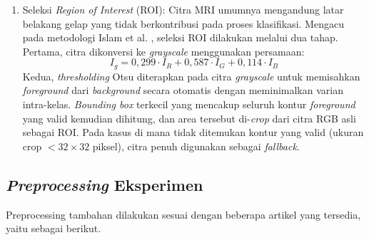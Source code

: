 \begin{enumerate}
	\item Seleksi \textit{Region of Interest} (ROI):
	Citra MRI umumnya mengandung latar belakang gelap yang tidak berkontribusi 
	pada proses klasifikasi. Mengacu pada metodologi Islam et al. \cite{islam2024deepfusion}, 
	seleksi ROI dilakukan melalui dua tahap. Pertama, citra dikonversi ke 
	\textit{grayscale} menggunakan persamaan:
	\begin{equation}
		I_g = 0{,}299 \cdot I_R + 0{,}587 \cdot I_G + 0{,}114 \cdot I_B
	\end{equation}
	Kedua, \textit{thresholding} Otsu diterapkan pada citra \textit{grayscale} 
	untuk memisahkan \textit{foreground} dari \textit{background} secara otomatis 
	dengan meminimalkan varian intra-kelas. \textit{Bounding box} terkecil yang 
	mencakup seluruh kontur \textit{foreground} yang valid kemudian dihitung, 
	dan area tersebut di-\textit{crop} dari citra RGB asli sebagai ROI. 
	Pada kasus di mana tidak ditemukan kontur yang valid (ukuran crop $< 32 \times 32$ 
	piksel), citra penuh digunakan sebagai \textit{fallback}.
\end{enumerate}

\subsection{\textit{Preprocessing} Eksperimen}
Preprocessing tambahan dilakukan sesuai dengan beberapa artikel yang tersedia, yaitu sebagai berikut.

